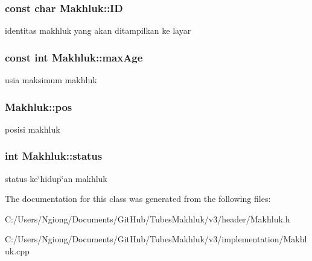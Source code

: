 \subsubsection[{\texorpdfstring{ID}{ID}}]{\setlength{\rightskip}{0pt plus 5cm}const char Makhluk\+::\+ID\hspace{0.3cm}{\ttfamily [protected]}}\hypertarget{class_makhluk_a287dd5d101d81990399f00f4a77a36f5}{}\label{class_makhluk_a287dd5d101d81990399f00f4a77a36f5}
identitas makhluk yang akan ditampilkan ke layar 
\subsubsection[{\texorpdfstring{max\+Age}{maxAge}}]{\setlength{\rightskip}{0pt plus 5cm}const int Makhluk\+::max\+Age\hspace{0.3cm}{\ttfamily [protected]}}\hypertarget{class_makhluk_a50350ef02b62af484c769b8118f8c4ae}{}\label{class_makhluk_a50350ef02b62af484c769b8118f8c4ae}
usia maksimum makhluk 
\subsubsection[{\texorpdfstring{pos}{pos}}]{ Makhluk\+::pos\hspace{0.3cm}{\ttfamily [protected]}}\hypertarget{class_makhluk_a920e46e39a404909a292802669bed0c2}{}\label{class_makhluk_a920e46e39a404909a292802669bed0c2}
posisi makhluk 
\subsubsection[{\texorpdfstring{status}{status}}]{\setlength{\rightskip}{0pt plus 5cm}int Makhluk\+::status\hspace{0.3cm}{\ttfamily [protected]}}\hypertarget{class_makhluk_aa3eefed357a56f6b86f0080083d91d31}{}\label{class_makhluk_aa3eefed357a56f6b86f0080083d91d31}
status ke\char`\"{}hidup\char`\"{}an makhluk 

The documentation for this class was generated from the following files\+:\begin{DoxyCompactItemize}
\item 
C\+:/\+Users/\+Ngiong/\+Documents/\+Git\+Hub/\+Tubes\+Makhluk/v3/header/Makhluk.\+h\item 
C\+:/\+Users/\+Ngiong/\+Documents/\+Git\+Hub/\+Tubes\+Makhluk/v3/implementation/Makhluk.\+cpp\end{DoxyCompactItemize}
